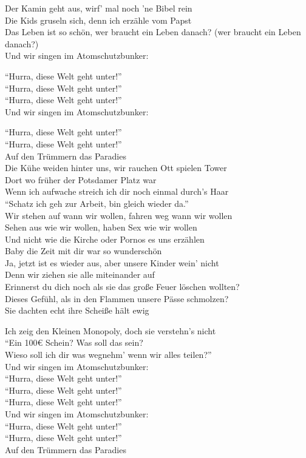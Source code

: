 \documentclass[]{book}
\begin{document}
Der Kamin geht aus, wirf' mal noch 'ne Bibel rein\\
Die Kids gruseln sich, denn ich erzähle vom Papst\\
Das Leben ist so schön, wer braucht ein Leben danach? (wer braucht ein Leben danach?)\\
Und wir singen im Atomschutzbunker:

``Hurra, diese Welt geht unter!''\\
``Hurra, diese Welt geht unter!''\\
``Hurra, diese Welt geht unter!''\\
Und wir singen im Atomschutzbunker:

``Hurra, diese Welt geht unter!''\\
``Hurra, diese Welt geht unter!''\\
Auf den Trümmern das Paradies\\
Die Kühe weiden hinter uns, wir rauchen Ott spielen Tower\\
Dort wo früher der Potsdamer Platz war\\
Wenn ich aufwache streich ich dir noch einmal durch's Haar\\
``Schatz ich geh zur Arbeit, bin gleich wieder da.''\\
Wir stehen auf wann wir wollen, fahren weg wann wir wollen\\
Sehen aus wie wir wollen, haben Sex wie wir wollen\\
Und nicht wie die Kirche oder Pornos es uns erzählen\\
Baby die Zeit mit dir war so wunderschön\\
Ja, jetzt ist es wieder aus, aber unsere Kinder wein' nicht\\
Denn wir ziehen sie alle miteinander auf\\
Erinnerst du dich noch als sie das große Feuer löschen wollten?\\
Dieses Gefühl, als in den Flammen unsere Pässe schmolzen?\\
Sie dachten echt ihre Scheiße hält ewig

Ich zeig den Kleinen Monopoly, doch sie verstehn's nicht\\
``Ein 100€ Schein? Was soll das sein?\\
Wieso soll ich dir was wegnehm' wenn wir alles teilen?''\\
Und wir singen im Atomschutzbunker:\\
``Hurra, diese Welt geht unter!''\\
``Hurra, diese Welt geht unter!''\\
``Hurra, diese Welt geht unter!''\\
Und wir singen im Atomschutzbunker:\\
``Hurra, diese Welt geht unter!''\\
``Hurra, diese Welt geht unter!''\\
Auf den Trümmern das Paradies
\end{document}
